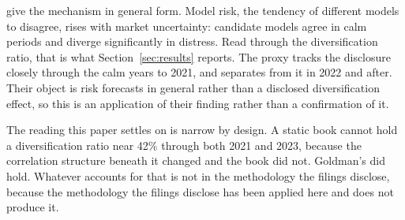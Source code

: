 \citet{danielsson2016modelrisk} give the mechanism in general form. Model risk,
the tendency of different models to disagree, rises with market
uncertainty: candidate models agree in calm periods and diverge significantly
in distress. Read through the diversification ratio, that is what
Section~\ref{sec:results} reports. The proxy tracks the disclosure closely
through the calm years to 2021, and separates from it in 2022 and after.
Their object is risk forecasts in general rather than a disclosed
diversification effect, so this is an application of their finding rather than
a confirmation of it.

The reading this paper settles on is narrow by design. A static book cannot
hold a diversification ratio near 42\% through both 2021 and 2023, because the
correlation structure beneath it changed and the book did not. Goldman's did
hold. Whatever accounts for that is not in the methodology the filings
disclose, because the methodology the filings disclose has been applied here
and does not produce it.
